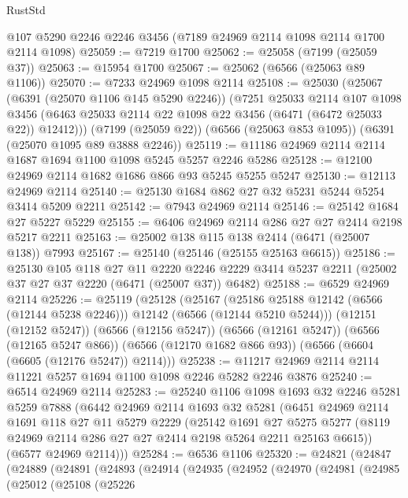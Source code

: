 \begin{lexlean}{RustStd}
\begin{coremodule}
{\begin{coremodule}
{{{{{{{{{{{{{{{{{{{{{{{{{{    @107
    @5290
    @2246
    @2246
    @3456
    (@7189 @24969 @2114 @1098 @2114 @1700 @2114 @1098)
@25059 := @7219 @1700
@25062 := @25058 (@7199 (@25059 @37))
@25063 := @15954 @1700
@25067 := @25062 (@6566 (@25063 @89 @1106))
@25070 := @7233 @24969 @1098 @2114
@25108 := @25030
    (@25067
      (@6391 (@25070 @1106 @145 @5290 @2246))
      (@7251
        @25033
        @2114
        @107
        @1098
        @3456
        (@6463 @25033 @2114 @22 @1098 @22 @3456 (@6471 (@6472 @25033 @22)) @12412)))
    (@7199 (@25059 @22))
    (@6566 (@25063 @853 @1095))
    (@6391 (@25070 @1095 @89 @3888 @2246))
@25119 := @11186 @24969 @2114 @2114 @1687 @1694 @1100 @1098 @5245 @5257 @2246 @5286
@25128 := @12100 @24969 @2114 @1682 @1686 @866 @93 @5245 @5255 @5247
@25130 := @12113 @24969 @2114
@25140 := @25130 @1684 @862 @27 @32 @5231 @5244 @5254 @3414 @5209 @2211
@25142 := @7943 @24969 @2114
@25146 := @25142 @1684 @27 @5227 @5229
@25155 := @6406 @24969 @2114 @286 @27 @27 @2414 @2198 @5217 @2211
@25163 := @25002 @138 @115 @138 @2414 (@6471 (@25007 @138)) @7993
@25167 := @25140 (@25146 (@25155 @25163 @6615))
@25186 := @25130
    @105
    @118
    @27
    @11
    @2220
    @2246
    @2229
    @3414
    @5237
    @2211
    (@25002 @37 @27 @37 @2220 (@6471 (@25007 @37)) @6482)
@25188 := @6529 @24969 @2114
@25226 := @25119
    (@25128
      (@25167
        (@25186 @25188 @12142 (@6566 (@12144 @5238 @2246)))
        @12142
        (@6566 (@12144 @5210 @5244)))
      (@12151 (@12152 @5247))
      (@6566 (@12156 @5247))
      (@6566 (@12161 @5247))
      (@6566 (@12165 @5247 @866))
      (@6566 (@12170 @1682 @866 @93))
      (@6566 (@6604 (@6605 (@12176 @5247)) @2114)))
@25238 := @11217 @24969 @2114 @2114 @11221 @5257 @1694 @1100 @1098 @2246 @5282 @2246 @3876
@25240 := @6514 @24969 @2114
@25283 := @25240
    @1106
    @1098
    @1693
    @32
    @2246
    @5281
    @5259
    @7888
    (@6442
      @24969
      @2114
      @1693
      @32
      @5281
      (@6451
        @24969
        @2114
        @1691
        @118
        @27
        @11
        @5279
        @2229
        (@25142
          @1691
          @27
          @5275
          @5277
          (@8119 @24969 @2114 @286 @27 @27 @2414 @2198 @5264 @2211 @25163 @6615))
        (@6577 @24969 @2114)))
@25284 := @6536 @1106
@25320 := @24821
    (@24847
      (@24889
        (@24891
          (@24893
            (@24914
              (@24935
                (@24952
                  (@24970
                    (@24981
                      (@24985
                        (@25012
                          (@25108
                            (@25226
}}}}}}}}}}}}}}}}}}}}}}}}}}
\end{coremodule}}
\end{coremodule}
\end{lexlean}
